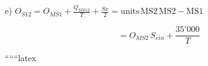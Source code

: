 e) \( O_{S12} = O_{MS1} + \frac{Q_{MS12}}{T} + \frac{Sx}{2} = \text{units} \, \text{MS2} \, \text{MS2} - \text{MS1} \)

\[ = O_{MS2} \, S_{ein} + \frac{35'000}{T} \]

``````latex